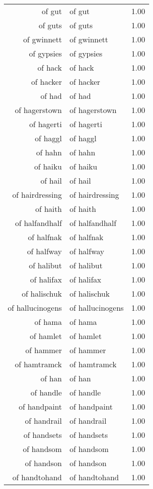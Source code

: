 \begin{table}[ht]
\begin{tabular}{rlr}
  of gut & of gut & 1.00 \\ 
  of guts & of guts & 1.00 \\ 
  of gwinnett & of gwinnett & 1.00 \\ 
  of gypsies & of gypsies & 1.00 \\ 
  of hack & of hack & 1.00 \\ 
  of hacker & of hacker & 1.00 \\ 
  of had & of had & 1.00 \\ 
  of hagerstown & of hagerstown & 1.00 \\ 
  of hagerti & of hagerti & 1.00 \\ 
  of haggl & of haggl & 1.00 \\ 
  of hahn & of hahn & 1.00 \\ 
  of haiku & of haiku & 1.00 \\ 
  of hail & of hail & 1.00 \\ 
  of hairdressing & of hairdressing & 1.00 \\ 
  of haith & of haith & 1.00 \\ 
  of halfandhalf & of halfandhalf & 1.00 \\ 
  of halfnak & of halfnak & 1.00 \\ 
  of halfway & of halfway & 1.00 \\ 
  of halibut & of halibut & 1.00 \\ 
  of halifax & of halifax & 1.00 \\ 
  of halischuk & of halischuk & 1.00 \\ 
  of hallucinogens & of hallucinogens & 1.00 \\ 
  of hama & of hama & 1.00 \\ 
  of hamlet & of hamlet & 1.00 \\ 
  of hammer & of hammer & 1.00 \\ 
  of hamtramck & of hamtramck & 1.00 \\ 
  of han & of han & 1.00 \\ 
  of handle & of handle & 1.00 \\ 
  of handpaint & of handpaint & 1.00 \\ 
  of handrail & of handrail & 1.00 \\ 
  of handsets & of handsets & 1.00 \\ 
  of handsom & of handsom & 1.00 \\ 
  of handson & of handson & 1.00 \\ 
  of handtohand & of handtohand & 1.00 \\ 

\end{tabular}
\end{table}
